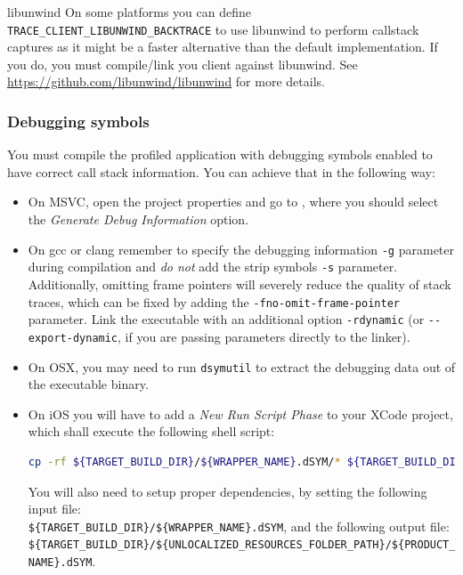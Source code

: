 \documentclass[hidelinks,titlepage,a4paper]{article}
\begin{document}
\begin{bclogo}[
noborder=true,
couleur=black!5,
logo=\bclampe
]{libunwind}
On some platforms you can define \texttt{TRACE\_CLIENT\_LIBUNWIND\_BACKTRACE} to use libunwind to perform callstack captures as it might be a faster alternative than the default implementation. If you do, you must compile/link you client against libunwind. See \url{https://github.com/libunwind/libunwind} for more details.
\end{bclogo}

\subsubsection{Debugging symbols}

You must compile the profiled application with debugging symbols enabled to have correct call stack information. You can achieve that in the following way:

\begin{itemize}
\item On MSVC, open the project properties and go to , where you should select the \emph{Generate Debug Information} option.
\item On gcc or clang remember to specify the debugging information \texttt{-g} parameter during compilation and \emph{do not} add the strip symbols \texttt{-s} parameter. Additionally, omitting frame pointers will severely reduce the quality of stack traces, which can be fixed by adding the \texttt{-fno-omit-frame-pointer} parameter. Link the executable with an additional option \texttt{-rdynamic} (or \texttt{-{}-export-dynamic}, if you are passing parameters directly to the linker).
\item On OSX, you may need to run \texttt{dsymutil} to extract the debugging data out of the executable binary.
\item On iOS you will have to add a \emph{New Run Script Phase} to your XCode project, which shall execute the following shell script:

\begin{lstlisting}[language=sh]
cp -rf ${TARGET_BUILD_DIR}/${WRAPPER_NAME}.dSYM/* ${TARGET_BUILD_DIR}/${UNLOCALIZED_RESOURCES_FOLDER_PATH}/${PRODUCT_NAME}.dSYM
\end{lstlisting}

You will also need to setup proper dependencies, by setting the following input file:\\
\texttt{\$\{TARGET\_BUILD\_DIR\}/\$\{WRAPPER\_NAME\}.dSYM}, and the following output file:\\
\texttt{\$\{TARGET\_BUILD\_DIR\}/\$\{UNLOCALIZED\_RESOURCES\_FOLDER\_PATH\}/\$\{PRODUCT\_NAME\}.dSYM}.
\end{itemize}
\end{document}

